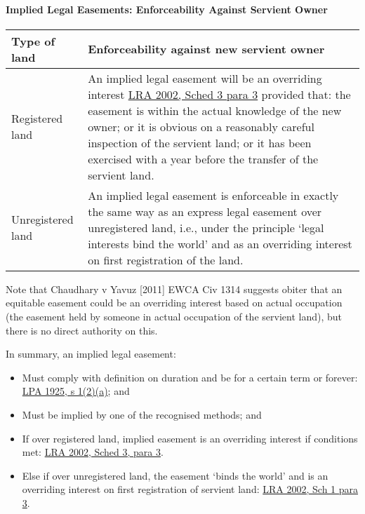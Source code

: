 \documentclass[
]{article}
\providecommand{\tightlist}{%
  \setlength{\itemsep}{0pt}\setlength{\parskip}{0pt}}
\begin{document}
\hypertarget{implied-legal-easements-enforceability-against-servient-owner}{%
\paragraph{Implied Legal Easements: Enforceability Against Servient
Owner}\label{implied-legal-easements-enforceability-against-servient-owner}}

\begin{longtable}[]{@{}ll@{}}
\toprule()
Type of land & Enforceability against new servient owner \\
\midrule()
\endhead
Registered land & An implied legal easement will be an overriding
interest
\href{https://www.legislation.gov.uk/ukpga/2002/9/schedule/3}{LRA 2002,
Sched 3 para 3} provided that: the easement is within the actual
knowledge of the new owner; or it is obvious on a reasonably careful
inspection of the servient land; or it has been exercised with a year
before the transfer of the servient land. \\
Unregistered land & An implied legal easement is enforceable in exactly
the same way as an express legal easement over unregistered land, i.e.,
under the principle `legal interests bind the world' and as an
overriding interest on first registration of the land. \\
\bottomrule()
\end{longtable}

Note that Chaudhary v Yavuz {[}2011{]} EWCA Civ 1314 suggests obiter
that an equitable easement could be an overriding interest based on
actual occupation (the easement held by someone in actual occupation of
the servient land), but there is no direct authority on this.

In summary, an implied legal easement:

\begin{itemize}
\tightlist
\item
  Must comply with definition on duration and be for a certain term or
  forever:
  \href{https://www.legislation.gov.uk/ukpga/Geo5/15-16/20/section/1}{LPA
  1925, s 1(2)(a)}; and
\item
  Must be implied by one of the recognised methods; and
\item
  If over registered land, implied easement is an overriding interest if
  conditions met:
  \href{https://www.legislation.gov.uk/ukpga/2002/9/schedule/3}{LRA
  2002, Sched 3, para 3}.
\item
  Else if over unregistered land, the easement `binds the world' and is
  an overriding interest on first registration of servient land:
  \href{https://www.legislation.gov.uk/ukpga/2002/9/schedule/1}{LRA
  2002, Sch 1 para 3}.
\end{itemize}
\end{document}
